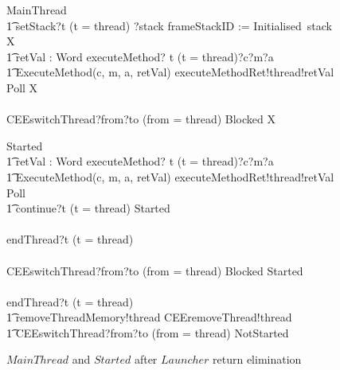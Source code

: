 \begin{figure}[tp!]
  \centering
  \setlength{\zedtab}{0.4cm}
  \setlength{\zedindent}{0pt}
  \setlength{\zedleftsep}{0pt}
  \setlength{\abovedisplayskip}{0pt}
  \setlength{\belowdisplayskip}{0pt}
  \setlength{\abovedisplayshortskip}{0pt}
  \setlength{\belowdisplayshortskip}{0pt}
  \begin{circusaction}
    MainThread \circdef \\
    \t1 setStack?t \prefixcolon (t = thread) ?stack \then frameStackID := Initialised~stack \circseq \circmu X \circspot \\
    \t1 \circblockbegin
    \circvar retVal : Word \circspot
    executeMethod? t \prefixcolon (t = thread)?c?m?a \then {} \\
    \t1 ExecuteMethod(c, m, a, retVal) \circseq
    executeMethodRet!thread!retVal \then Poll \circseq  X \\
    {} \extchoice {} \\
    CEEswitchThread?from?to \prefixcolon (from = thread) \then Blocked \circseq X
    \circblockend
  \end{circusaction}
  
  \begin{circusaction}
    Started \circdef \\
    \t1 \circblockbegin
    \circvar retVal : Word \circspot executeMethod? t \prefixcolon (t = thread)?c?m?a \then {} \\
    \t1 ExecuteMethod(c, m, a, retVal) \circseq executeMethodRet!thread!retVal \then Poll \circseq \\
    \t1 \circblockbegin
    continue?t \prefixcolon (t = thread) \then Started \\
    {} \extchoice {} \\
    endThread?t \prefixcolon (t = thread) \then \Skip
    \circblockend \\
    {} \extchoice {} \\
    CEEswitchThread?from?to \prefixcolon (from = thread) \then Blocked \circseq Started \\
    {} \extchoice {} \\
    endThread?t \prefixcolon (t = thread) \then \Skip
    \circblockend \circseq \\
    \t1 removeThreadMemory!thread \then CEEremoveThread!thread \\
    \t1 {} \then CEEswitchThread?from?to \prefixcolon (from = thread) \then NotStarted
  \end{circusaction}
  \caption{$MainThread$ and $Started$ after $Launcher$ return
    elimination}
  \label{efs-eliminate-returns-MainThread-Started-figure}
\end{figure}

